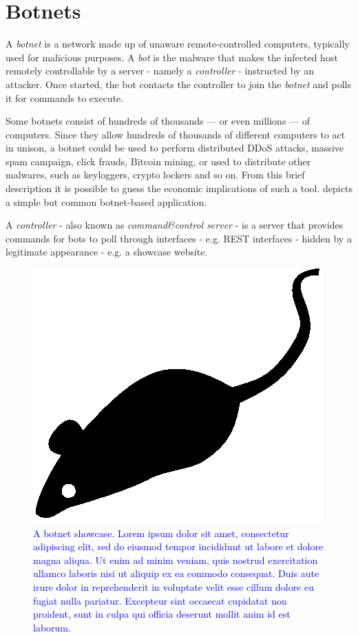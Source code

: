 \section{Botnets}
\label{sec:botnets}

A \textit{botnet} is a network made up of unaware remote-controlled computers, typically used for malicious purposes.
A \textit{bot} is the malware that makes the infected host remotely controllable by a server - namely a \textit{controller} -  instructed by an attacker. Once started, the bot contacts the controller to join the \textit{botnet} and polls it for commands to execute.

Some botnets consist of hundreds of thousands — or even millions — of computers. Since they allow hundreds of thousands of different computers to act in unison, a botnet could be used to perform distributed DDoS attacks, massive spam campaign, click frauds, Bitcoin mining, or used to distribute other malwares, such as keyloggers, crypto lockers and so on. From this brief description it is possible to guess the economic implications of such a tool.  depicts a simple but common botnet-based application.

A \textit{controller} - also known as \textit{command\&control server} - is a server that provides commands for bots to poll through interfaces - e.g. REST interfaces - hidden by a legitimate appearance - e.g. a showcase website.

\begin{figure}[tp]
  \centering
  \includegraphics{./fig/acmlarge-mouse}
  \caption{\textcolor{blue}{A botnet showcase. Lorem ipsum dolor sit amet, consectetur adipiscing elit, sed do eiusmod tempor incididunt ut labore et dolore magna aliqua. Ut enim ad minim veniam, quis nostrud exercitation ullamco laboris nisi ut aliquip ex ea commodo consequat. Duis aute irure dolor in reprehenderit in voluptate velit esse cillum dolore eu fugiat nulla pariatur. Excepteur sint occaecat cupidatat non proident, sunt in culpa qui officia deserunt mollit anim id est laborum.}}
    \label{fig:botnet-showcase}
\end{figure}

